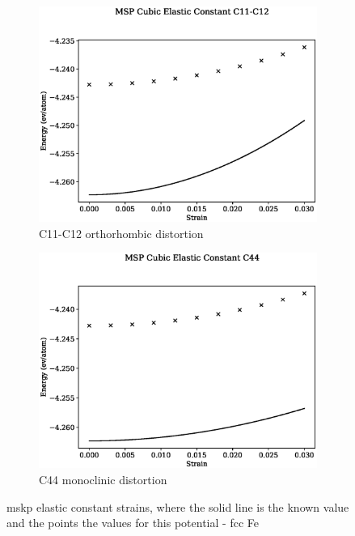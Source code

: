 \begin{figure}[htb]
\begin{subfigure}{.42\textwidth}
  \centering
  \includegraphics[width=.90\linewidth]{chapters/potentials_fe_pd_ru/feru_potential/ec_mskp/msp_c11_c12_plot_bp_1.eps}  
  \caption{C11-C12 orthorhombic distortion}
  \label{fig:feru-fefcc-c11c12}
\end{subfigure}
\begin{subfigure}{.42\textwidth}
  \centering
  \includegraphics[width=.90\linewidth]{chapters/potentials_fe_pd_ru/feru_potential/ec_mskp/msp_c44_plot_bp_1.eps}  
  \caption{C44 monoclinic distortion}
  \label{fig:feru-fefcc-c44}
\end{subfigure}
\label{fig:feru-fefcc-c11c12c44}
\caption{\acrshort{mskp} elastic constant strains, where the solid line is the known value and the points the values for this potential - \acrshort{fcc} Fe}
\end{figure}







